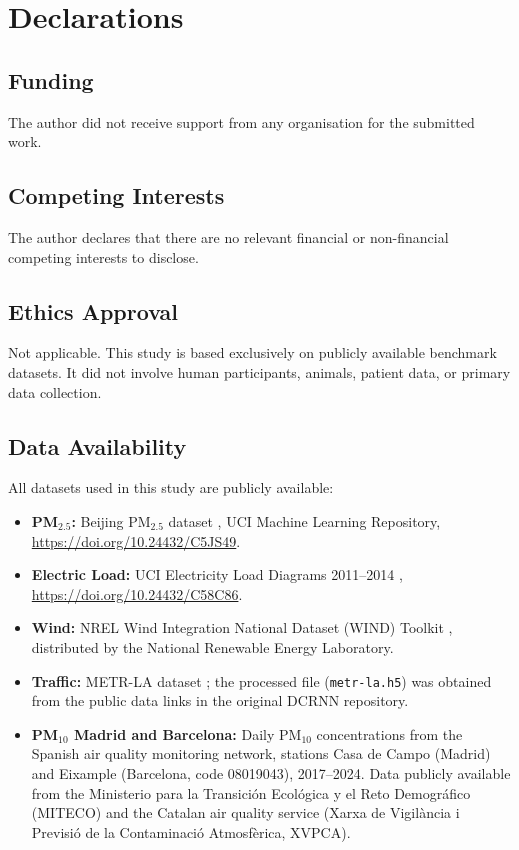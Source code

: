 \documentclass[pdflatex,sn-mathphys]{sn-jnl}
\begin{document}
\section*{Declarations}
\subsection*{Funding}
The author did not receive support from any organisation for the submitted work.
\subsection*{Competing Interests}
The author declares that there are no relevant financial or non-financial competing interests to disclose.
\subsection*{Ethics Approval}
Not applicable. This study is based exclusively on publicly available benchmark datasets. It did not involve human participants, animals, patient data, or primary data collection.
\subsection*{Data Availability}
All datasets used in this study are publicly available:
\begin{itemize}
  \item \textbf{PM$_{2.5}$:} Beijing PM$_{2.5}$ dataset \citep{chen2015beijingpm25}, UCI Machine Learning Repository, \url{https://doi.org/10.24432/C5JS49}.
  \item \textbf{Electric Load:} UCI Electricity Load Diagrams 2011--2014 \citep{trindade2015}, \url{https://doi.org/10.24432/C58C86}.
  \item \textbf{Wind:} NREL Wind Integration National Dataset (WIND) Toolkit \citep{draxl2015}, distributed by the National Renewable Energy Laboratory.
  \item \textbf{Traffic:} METR-LA dataset \citep{li2018dcrnn}; the processed file (\texttt{metr-la.h5}) was obtained from the public data links in the original DCRNN repository.
  \item \textbf{PM$_{10}$ Madrid and Barcelona:} Daily PM$_{10}$ concentrations from the Spanish air quality monitoring network, stations Casa de Campo (Madrid) and Eixample (Barcelona, code 08019043), 2017--2024. Data publicly available from the Ministerio para la Transici\'on Ecol\'ogica y el Reto Demogr\'afico (MITECO) and the Catalan air quality service (Xarxa de Vigil\`ancia i Previsi\'o de la Contaminaci\'o Atmosf\`erica, XVPCA).
\end{itemize}
\end{document}
